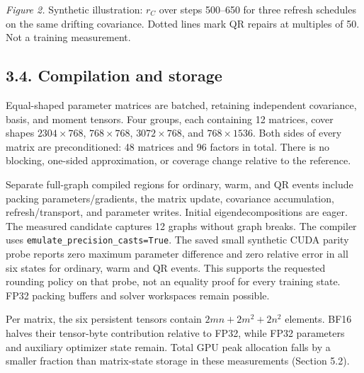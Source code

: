\emph{Figure 2.} Synthetic illustration: \(r_C\) over steps 500--650 for
three refresh schedules on the same drifting covariance. Dotted lines
mark QR repairs at multiples of 50. Not a training measurement.

\hypertarget{compilation-and-storage}{%
\subsection{3.4. Compilation and
storage}\label{compilation-and-storage}}

Equal-shaped parameter matrices are batched, retaining independent
covariance, basis, and moment tensors. Four groups, each containing 12
matrices, cover shapes \(2304\times768\), \(768\times768\),
\(3072\times768\), and \(768\times1536\). Both sides of every matrix are
preconditioned: 48 matrices and 96 factors in total. There is no
blocking, one-sided approximation, or coverage change relative to the
reference.

Separate full-graph compiled regions for ordinary, warm, and QR events
include packing parameters/gradients, the matrix update, covariance
accumulation, refresh/transport, and parameter writes. Initial
eigendecompositions are eager. The measured candidate captures 12 graphs
without graph breaks. The compiler~\citep{ansel2024pytorch} uses
\texttt{emulate\_precision\_casts=True}. The saved small synthetic CUDA
parity probe reports zero maximum parameter difference and zero relative
error in all six states for ordinary, warm and QR events. This supports
the requested rounding policy on that probe, not an equality proof for
every training state. FP32 packing buffers and solver workspaces remain
possible.

Per matrix, the six persistent tensors contain \(2mn+2m^2+2n^2\)
elements. BF16 halves their tensor-byte contribution relative to FP32,
while FP32 parameters and auxiliary optimizer state remain. Total GPU
peak allocation falls by a smaller fraction than matrix-state storage in
these measurements (Section 5.2).
